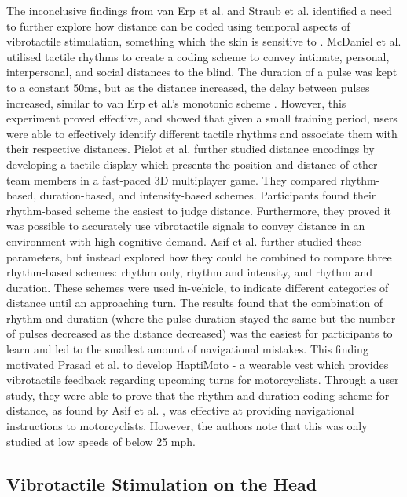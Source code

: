 \documentclass{mpaper}
\begin{document}
The inconclusive findings from van Erp et al. \cite{10.1145/1060581.1060585} and Straub et al. \cite{5326374} identified a need to further explore how distance can be coded using temporal aspects of vibrotactile stimulation, something which the skin is sensitive to \cite{doi:10.1068/p5014}. McDaniel et al. \cite{10.1145/1520340.1520718} utilised tactile rhythms to create a coding scheme to convey intimate, personal, interpersonal, and social distances to the blind. The duration of a pulse was kept to a constant 50ms, but as the distance increased, the delay between pulses increased, similar to van Erp et al.'s monotonic scheme \cite{10.1145/1060581.1060585}. However, this experiment proved effective, and showed that given a small training period, users were able to effectively identify different tactile rhythms and associate them with their respective distances. Pielot et al. \cite{10.1145/1753326.1753581} further studied distance encodings by developing a tactile display which presents the position and distance of other team members in a fast-paced 3D multiplayer game. They compared rhythm-based, duration-based, and intensity-based schemes. Participants found their rhythm-based scheme the easiest to judge distance. Furthermore, they proved it was possible to accurately use vibrotactile signals to convey distance in an environment with high cognitive demand. Asif et al. \cite{10.1145/1868914.1868923} further studied these parameters, but instead explored how they could be combined to compare three rhythm-based schemes: rhythm only, rhythm and intensity, and rhythm and duration. These schemes were used in-vehicle, to indicate different categories of distance until an approaching turn. The results found that the combination of rhythm and duration (where the pulse duration stayed the same but the number of pulses decreased as the distance decreased) was the easiest for participants to learn and led to the smallest amount of navigational mistakes. This finding motivated Prasad et al. \cite{10.1145/2556288.2557404} to develop HaptiMoto - a wearable vest which provides vibrotactile feedback regarding upcoming turns for motorcyclists. Through a user study, they were able to prove that the rhythm and duration coding scheme for distance, as found by Asif et al. \cite{10.1145/1868914.1868923}, was effective at providing navigational instructions to motorcyclists. However, the authors note that this was only studied at low speeds of below 25 mph.


\subsection{Vibrotactile Stimulation on the Head}
\end{document}
